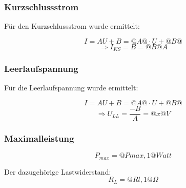 \documentclass{article}
\begin{document}






\subsubsection{Kurzschlussstrom}

Für den Kurzschlussstrom wurde ermittelt:

$$I=AU+B=@A@\cdot U + @B@$$
$$\Rightarrow I_{KS}=B=@B@A$$


\subsubsection{Leerlaufspannung}

Für die Leerlaufspannung wurde ermittelt:

$$I=AU+B=@A@\cdot U + @B@$$
$$\Rightarrow U_{LL}=\frac{-B}{A}=@x@V$$

\subsubsection{Maximalleistung}


$$P_{max}=@Pmax,1@Watt$$

Der dazugehörige Lastwiderstand: $$R_{L}=@Rl,1@ \Omega$$
\end{document}
